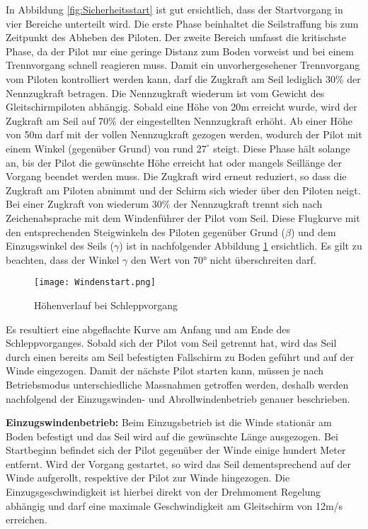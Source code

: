 In Abbildung \ref{fig:Sicherheitsstart} ist gut ersichtlich, dass der Startvorgang in vier Bereiche unterteilt wird. Die erste Phase beinhaltet die Seilstraffung bis zum Zeitpunkt des Abheben des Piloten. Der zweite Bereich umfasst die kritischste Phase, da der Pilot nur eine geringe Distanz zum Boden vorweist und bei einem Trennvorgang schnell reagieren muss. Damit ein unvorhergesehener Trennvorgang vom Piloten kontrolliert werden kann, darf die Zugkraft am Seil lediglich 30\% der Nennzugkraft betragen. Die Nennzugkraft wiederum ist vom Gewicht des Gleitschirmpiloten abhängig. Sobald eine Höhe von 20m erreicht wurde, wird der Zugkraft am Seil auf 70\% der eingestellten Nennzugkraft erhöht. Ab einer Höhe von 50m darf mit der vollen Nennzugkraft gezogen werden, wodurch der Pilot mit einem Winkel (gegenüber Grund) von rund $27^\circ$ steigt. Diese Phase hält solange an, bis der Pilot die gewünschte Höhe erreicht hat oder mangels Seillänge der Vorgang beendet werden muss. Die Zugkraft wird erneut reduziert, so dass die Zugkraft am Piloten abnimmt und der Schirm sich wieder über den Piloten neigt. Bei einer Zugkraft von wiederum 30\% der Nennzugkraft trennt sich nach Zeichenabsprache mit dem Windenführer der Pilot vom Seil. Diese Flugkurve mit den entsprechenden Steigwinkeln des Piloten gegenüber Grund ($\beta$) und dem Einzugswinkel des Seils ($\gamma$) ist in nachfolgender Abbildung \ref{fig:HoehenverlaufSchlepp} ersichtlich. Es gilt zu beachten, dass der Winkel $\gamma$ den Wert von 70° nicht überschreiten darf.


\begin{figure}[H]
	\begin{center}
		\texttt{[image: Windenstart.png]}
		\caption{Höhenverlauf bei Schleppvorgang \cite{PhysikWindenschlepp}}
		\label{fig:HoehenverlaufSchlepp}
	\end{center}
\end{figure}

Es resultiert eine abgeflachte Kurve am Anfang und am Ende des Schleppvorganges. Sobald sich der Pilot vom Seil getrennt hat, wird das Seil durch einen bereits am Seil befestigten Fallschirm zu Boden geführt und auf der Winde eingezogen. Damit der nächste Pilot starten kann, müssen je nach Betriebsmodus unterschiedliche Massnahmen getroffen werden, deshalb werden nachfolgend der Einzugswinden- und Abrollwindenbetrieb genauer beschrieben.


\textbf{Einzugswindenbetrieb:}
Beim Einzugsbetrieb ist die Winde stationär am Boden befestigt und das Seil wird auf die gewünschte Länge ausgezogen. Bei Startbeginn befindet sich der Pilot gegenüber der Winde einige hundert Meter entfernt. Wird der Vorgang gestartet, so wird das Seil dementsprechend auf der Winde aufgerollt, respektive der Pilot zur Winde hingezogen. Die Einzugsgeschwindigkeit ist hierbei direkt von der Drehmoment Regelung abhängig und darf eine maximale Geschwindigkeit am Gleitschirm von 12m/s erreichen.

